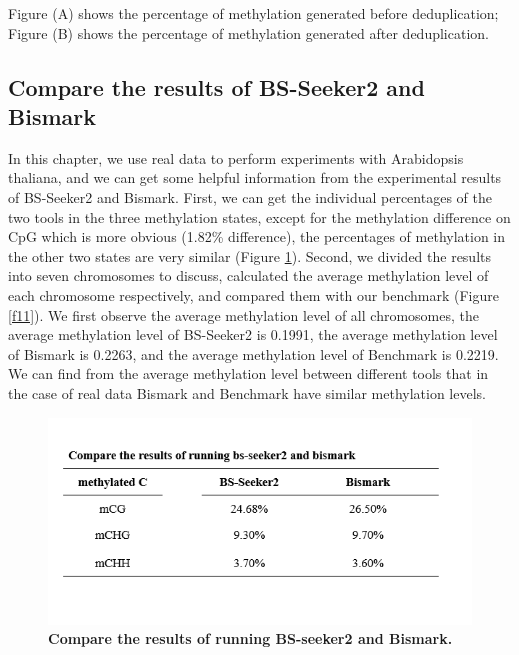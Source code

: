 \documentclass{PHlab-thesis}
\begin{document}
Figure (A) shows the percentage of methylation generated before deduplication; Figure (B) shows the percentage of methylation generated after deduplication.

\subsection{Compare the results of BS-Seeker2 and Bismark}
In this chapter, we use real data to perform experiments with Arabidopsis thaliana, and we can get some helpful information from the experimental results of BS-Seeker2 and Bismark. First, we can get the individual percentages of the two tools in the three methylation states, except for the methylation difference on CpG which is more obvious (1.82\% difference), the percentages of methylation in the other two states are very similar (Figure \ref{f10}). Second, we divided the results into seven chromosomes to discuss, calculated the average methylation level of each chromosome respectively, and compared them with our benchmark (Figure \ref{f11}). We first observe the average methylation level of all chromosomes, the average methylation level of BS-Seeker2 is 0.1991, the average methylation level of Bismark is 0.2263, and the average methylation level of Benchmark is 0.2219. We can find from the average methylation level between different tools that in the case of real data Bismark and Benchmark have similar methylation levels.

\begin{figure}[h]
  \centering
  \includegraphics[scale=0.8]{table/table3.png}
  \caption{\textbf{Compare the results of running BS-seeker2 and Bismark.}
  }
  \label{f10}
\end{figure}
\end{document}
